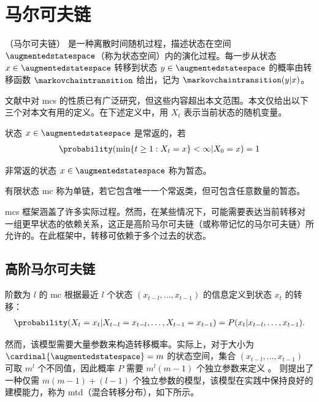 \section{马尔可夫链}
\label{sec:markov_chain}
（马尔可夫链）\cite{levin2017markov} 是一种离散时间随机过程，描述状态在空间 $\augmentedstatespace$（称为状态空间）内的演化过程。每一步从状态 $x\in\augmentedstatespace$ 转移到状态 $y\in\augmentedstatespace$ 的概率由转移函数 $\markovchaintransition$ 给出，记为 $\markovchaintransition(y\vert x)$。

文献中对 \glspl{mc} 的性质已有广泛研究，但这些内容超出本文范围。本文仅给出以下三个对本文有用的定义。在下述定义中，用 $X_t$ 表示当前状态的随机变量。


\begin{defi}[常返状态]
    状态 $x\in\augmentedstatespace$ 是常返的，若
    \begin{align*}
        \probability(\min\{t\ge1: X_t=x\}<\infty\vert X_0=x)=1
    \end{align*}
\end{defi}

\begin{defi}[暂态]
    非$\!$常返的状态 $x\in\augmentedstatespace$ 称为暂态。
\end{defi}

\begin{defi}[单链 \gls{mc}]
\label{def:unichain_mc}
    有限状态 \gls{mc} 称为单链，若它包含唯一一个常返类，但可包含任意数量的暂态。
\end{defi}

\glspl{mc} 框架涵盖了许多实际过程。然而，在某些情况下，可能需要表达当前转移对一组更早状态的依赖关系，这正是高阶马尔可夫链（或称带记忆的马尔可夫链）所允许的。在此框架中，转移可依赖于多个过去的状态。

\subsection{高阶马尔可夫链}
阶数为 $l$ 的 \gls{mc} 根据最近 $l$ 个状态 $(x_{t-l},\dots,x_{t-1})$ 的信息定义到状态 $x_t$ 的转移：
\begin{align*}
    \probability(X_t = x_t\vert X_{t-l}=x_{t-l},\dots,X_{t-1}=x_{t-1})=P(x_t\vert x_{t-l},\dots,x_{t-1}).
\end{align*}

然而，该模型需要大量参数来构造转移概率。实际上，对于大小为 $\cardinal{\augmentedstatespace}=m$ 的状态空间，集合 $(x_{t-l},\dots,x_{t-1})$ 可取 $m^l$ 个不同值，因此概率 $P$ 需要 $m^l(m-1)$ 个独立参数来定义 \cite{berchtold2002mixture}。\cite{raftery1985model} 则提出了一种仅需 $m(m-1) + (l-1)$ 个独立参数的模型，该模型在实践中保持良好的建模能力，称为 \gls{mtd}（混合转移分布），如下所示。

